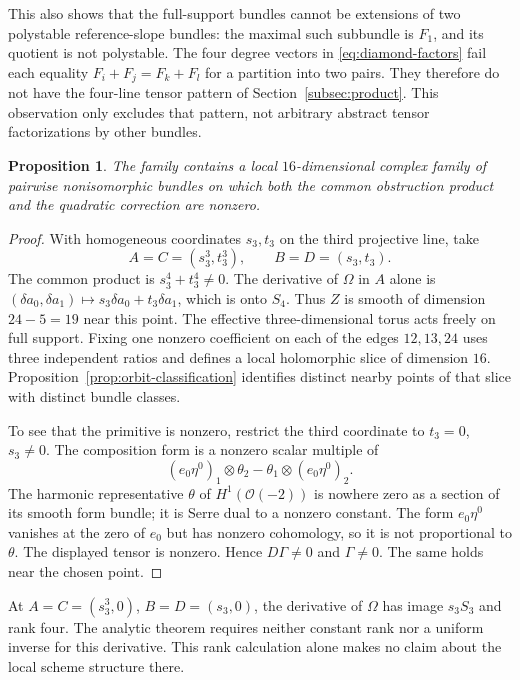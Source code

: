 \documentclass[11pt]{amsart}
\newtheorem{proposition}[theorem]{Proposition}
\theoremstyle{definition}
\theoremstyle{remark}
\newcommand{\cO}{\mathcal O}
\begin{document}
This also shows that the full-support bundles cannot be extensions of two
polystable reference-slope bundles: the maximal such subbundle is $F_1$,
and its quotient is not polystable. The four degree vectors in
\eqref{eq:diamond-factors} fail each equality
$F_i+F_j=F_k+F_l$ for a partition into two pairs. They therefore do not
have the four-line tensor pattern of Section~\ref{subsec:product}.
This observation only excludes that pattern, not arbitrary abstract tensor
factorizations by other bundles.

\begin{proposition}\label{prop:local16}
The family contains a local $16$-dimensional complex family of pairwise
nonisomorphic bundles on which both the common obstruction product and
the quadratic correction are nonzero.
\end{proposition}

\begin{proof}
With homogeneous coordinates $s_3,t_3$ on the third projective line, take
\begin{equation}\label{eq:smooth-diamond-point}
 A=C=(s_3^3,t_3^3),\qquad B=D=(s_3,t_3).
\end{equation}
The common product is $s_3^4+t_3^4\ne0$. The derivative of $\Omega$
in $A$ alone is
$(\delta a_0,\delta a_1)\mapsto s_3\delta a_0+t_3\delta a_1$,
which is onto $S_4$. Thus $Z$ is smooth of dimension $24-5=19$
near this point. The effective three-dimensional torus acts freely on full
support. Fixing one nonzero coefficient on each of the edges $12,13,24$
uses three independent ratios and defines a local holomorphic slice of
dimension $16$. Proposition~\ref{prop:orbit-classification} identifies
distinct nearby points of that slice with distinct bundle classes.

To see that the primitive is nonzero, restrict the third coordinate to
$t_3=0$, $s_3\ne0$. The composition form is a nonzero scalar multiple of
\[
 (e_0\eta^0)_1\otimes\theta_2
       -\theta_1\otimes(e_0\eta^0)_2.
\]
The harmonic representative $\theta$ of $H^1(\cO(-2))$ is nowhere zero
as a section of its smooth form bundle; it is Serre dual to a nonzero
constant. The form $e_0\eta^0$ vanishes at the zero of $e_0$ but has
nonzero cohomology, so it is not proportional to $\theta$. The displayed
tensor is nonzero. Hence $D\Gamma\ne0$ and $\Gamma\ne0$. The same
holds near the chosen point.
\end{proof}

At $A=C=(s_3^3,0)$, $B=D=(s_3,0)$, the derivative of $\Omega$ has
image $s_3S_3$ and rank four. The analytic theorem requires neither
constant rank nor a uniform inverse for this derivative. This rank
calculation alone makes no claim about the local scheme structure there.
\end{document}
